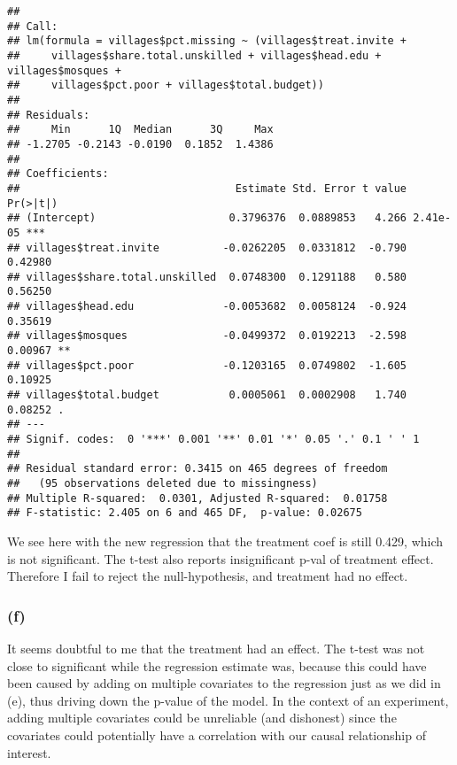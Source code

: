 \documentclass[]{article}
\begin{document}
\begin{verbatim}
## 
## Call:
## lm(formula = villages$pct.missing ~ (villages$treat.invite + 
##     villages$share.total.unskilled + villages$head.edu + villages$mosques + 
##     villages$pct.poor + villages$total.budget))
## 
## Residuals:
##     Min      1Q  Median      3Q     Max 
## -1.2705 -0.2143 -0.0190  0.1852  1.4386 
## 
## Coefficients:
##                                  Estimate Std. Error t value Pr(>|t|)    
## (Intercept)                     0.3796376  0.0889853   4.266 2.41e-05 ***
## villages$treat.invite          -0.0262205  0.0331812  -0.790  0.42980    
## villages$share.total.unskilled  0.0748300  0.1291188   0.580  0.56250    
## villages$head.edu              -0.0053682  0.0058124  -0.924  0.35619    
## villages$mosques               -0.0499372  0.0192213  -2.598  0.00967 ** 
## villages$pct.poor              -0.1203165  0.0749802  -1.605  0.10925    
## villages$total.budget           0.0005061  0.0002908   1.740  0.08252 .  
## ---
## Signif. codes:  0 '***' 0.001 '**' 0.01 '*' 0.05 '.' 0.1 ' ' 1
## 
## Residual standard error: 0.3415 on 465 degrees of freedom
##   (95 observations deleted due to missingness)
## Multiple R-squared:  0.0301, Adjusted R-squared:  0.01758 
## F-statistic: 2.405 on 6 and 465 DF,  p-value: 0.02675
\end{verbatim}

We see here with the new regression that the treatment coef is still
0.429, which is not significant. The t-test also reports insignificant
p-val of treatment effect. Therefore I fail to reject the
null-hypothesis, and treatment had no effect.

\hypertarget{f-1}{%
\subsubsection{(f)}\label{f-1}}

It seems doubtful to me that the treatment had an effect. The t-test was
not close to significant while the regression estimate was, because this
could have been caused by adding on multiple covariates to the
regression just as we did in (e), thus driving down the p-value of the
model. In the context of an experiment, adding multiple covariates could
be unreliable (and dishonest) since the covariates could potentially
have a correlation with our causal relationship of interest.
\end{document}
